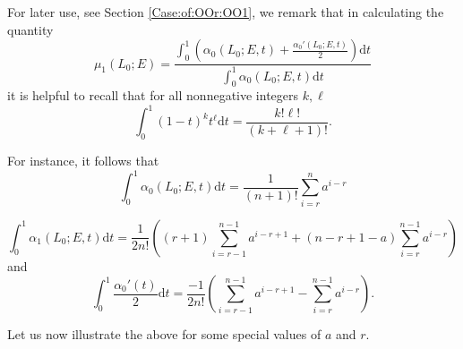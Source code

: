 \documentclass[10pt,letterpaper]{amsart}
\theoremstyle{definition}
\numberwithin{equation}{section}
\begin{document}
For later use, see Section \ref{Case:of:OOr:OO1}, we remark that in calculating the quantity
\begin{equation}\label{big:nef:slope}
\mu_1(L_0;E)  = \frac{ \int_0^1 \left( \alpha_0(L_0;E, t) + \frac{\alpha_0'(L_0;E,t)}{2} \right) \mathrm{d}t }{ \int_0^1 \alpha_0(L_0;E,t) \mathrm{d}t } 
\end{equation}
it is helpful to recall that for all nonnegative integers $k,\ell$
$$
\int_0^1(1-t)^kt^\ell \mathrm{d}t = \frac{k! \ell!}{(k+\ell+1)!} \text{.}
$$

For instance, it follows that 
$$
\int_0^1 \alpha_0(L_0;E,t) \mathrm{d}t = \frac{1}{(n+1)!} \sum_{i=r}^n a^{i-r}
$$

$$
\int_0^1 \alpha_1(L_0;E,t) \mathrm{d}t = \frac{1}{2n!} \left((r+1) \sum_{i = r-1}^{n-1} a^{i - r +1} + (n-r+1-a) \sum_{i=r}^{n-1} a^{i-r} \right)
$$
and
$$
\int_0^1 \frac{\alpha_0'(t)}{2}\mathrm{d}t = \frac{-1}{2n!} \left( \sum_{i=r-1}^{n-1} a^{i-r+1} - \sum_{i=r}^{n-1} a^{i-r} \right) \text{.}
$$

Let us now illustrate the above for some special values of $a$ and $r$.
\end{document}
